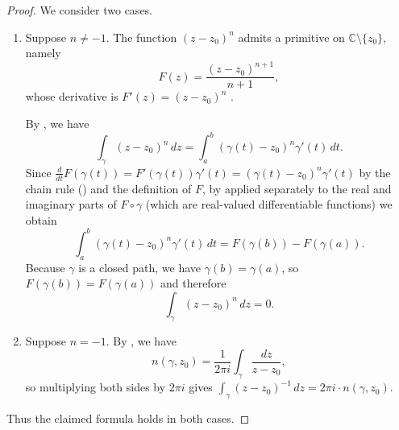 \begin{proof}
    We consider two cases.

    \begin{enumerate}
        \item Suppose $n \neq -1$. The function $(z - z_0)^n$ admits a  primitive on $\mathbb{C} \setminus \{z_0\}$, namely
        $$F(z) = \frac{(z - z_0)^{n+1}}{n+1},$$
        whose derivative is $F'(z) = (z - z_0)^n$
        .

        By , we have
        $$\int_{\gamma} (z - z_0)^n \, dz = \int_a^b (\gamma(t) - z_0)^n \gamma'(t) \, dt.$$
        Since $\frac{d}{dt} F(\gamma(t)) = F'(\gamma(t))\gamma'(t) = (\gamma(t) - z_0)^n \gamma'(t)$ by the chain rule () and the definition of $F$, by  applied separately to the real and imaginary parts of $F \circ \gamma$ (which are real-valued differentiable functions) we obtain
        $$\int_a^b (\gamma(t) - z_0)^n \gamma'(t) \, dt = F(\gamma(b)) - F(\gamma(a)).$$
        Because $\gamma$ is a closed path, we have $\gamma(b) = \gamma(a)$, so $F(\gamma(b)) = F(\gamma(a))$ and therefore
        $$\int_{\gamma} (z - z_0)^n \, dz = 0.$$

        \item Suppose $n = -1$. By , we have
        $$n(\gamma, z_0) = \frac{1}{2\pi i} \int_{\gamma} \frac{dz}{z - z_0},$$
        so multiplying both sides by $2\pi i$ gives $\int_{\gamma} (z - z_0)^{-1} \, dz = 2\pi i \cdot n(\gamma, z_0)$.
    \end{enumerate}

    Thus the claimed formula holds in both cases.
\end{proof}